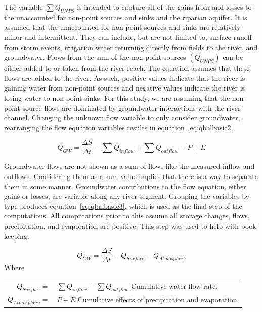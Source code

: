 \begin{linenumbers}
The variable $\sum{Q_{UNPS}}$ is intended to capture all of the gains from and losses to the unaccounted for non-point sources and sinks and the riparian aquifer.  It is assumed that the unaccounted for non-point sources and sinks are relatively minor and intermittent.  They can include, but are not limited to, surface runoff from storm events, irrigation water returning directly from fields to the river, and groundwater.  Flows from the sum of the non-point sources $(Q_{UNPS})$ can be either added to or taken from the river reach.  The equation assumes that these flows are added to the river.  As such, positive values indicate that the river is gaining water from non-point sources and negative values indicate the river is losing water to non-point sinks.  For this study, we are assuming that the non-point source flows are dominated by groundwater interactions with the river channel.  Changing the unknown flow variable to only consider groundwater, rearranging the flow equation variables results in equation~\ref{eq:qbalbasic2}.

\begin{equation}
	Q_{GW}=\frac{\Delta S}{\Delta t}-\sum{Q_{inflow}}+\sum{Q_{outflow}}-P+E
	\label{eq:qbalbasic2}
\end{equation}

Groundwater flows are not shown as a sum of flows like the measured inflow and outflows.  Considering them as a sum value implies that there is a way to separate them in some manner.  Groundwater contributions to the flow equation, either gains or losses, are variable along any river segment.  Grouping the variables by type produces equation~\ref{eq:qbalbasic3}, which is used as the final step of the computations.  All computations prior to this assume all storage changes, flows, precipitation, and evaporation are positive.  This step was used to help with book keeping.

\begin{equation}
	Q_{GW}=\frac{\Delta S}{\Delta t}-Q_{Surface}-Q_{Atmosphere}
	\label{eq:qbalbasic3}
\end{equation}
Where\\
\begin{tabular}{rl}
$Q_{Surface} =$& $\sum{Q_{inflow}} - \sum{Q_{outflow}}$ Cumulative water flow rate.\\
$Q_{Atmosphere} =$&$P-E$ Cumulative effects of precipitation and evaporation.\\
\end{tabular}\\


\end{linenumbers}
